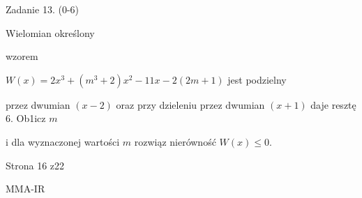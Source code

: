 \documentclass[a4paper,12pt]{article}
\begin{document}
Zadanie 13. (0-6)

Wielomian określony

wzorem

$W(x)=2x^{3}+(m^{3}+2)x^{2}-11x-2(2m+1)$ jest podzielny

przez dwumian $(x-2)$ oraz przy dzieleniu przez dwumian $(x+1)$ daje resztę 6. Ob1icz $m$

i dla wyznaczonej wartości $m$ rozwiąz nierówność $W(x)\leq 0.$

Strona 16 z22

MMA-IR
\end{document}
